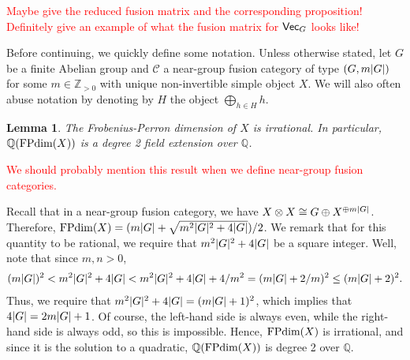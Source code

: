 \documentclass[12pt, reqno]{amsart}
\numberwithin{equation}{section}
\theoremstyle{plainspace}
\newtheorem{lemma}[theorem]{Lemma}
\theoremstyle{definitionspace}
\theoremstyle{remarkspace}
\renewenvironment{proof}{{\noindent\textbf{Proof.}}}{\null\hfill\qedsymbol}
\DeclarePairedDelimiter{\abs}{\lvert}{\rvert}
\newcommand{\mathcat}[1]{\mathcal{#1}}
\newcommand{\textcat}[1]{\textup{\textsf{#1}}}
\newcommand{\FPdim}{\textup{FPdim}}
\begin{document}
\noindent \textcolor{red}{Maybe give the reduced fusion matrix and the corresponding proposition! Definitely give an example of what the fusion matrix for $\textcat{Vec}_G$ looks like!}
\newline

\noindent Before continuing, we quickly define some notation. Unless otherwise stated, let $G$ be a finite Abelian group and $\mathcat{C}$ a near-group fusion category of type $(G, m\abs{G})$ for some $m \in \mathbb{Z}_{>0}$ with unique non-invertible simple object $X$. We will also often abuse notation by denoting by $H$ the object $\bigoplus_{h \in H}{h}$.
\newline

\begin{lemma}\label{lem:near-group_non-invertible_irrational}
The Frobenius-Perron dimension of $X$ is irrational. In particular, $\mathbb{Q}(\FPdim(X))$ is a degree 2 field extension over $\mathbb{Q}$.
\end{lemma}
\leavevmode

\noindent \textcolor{red}{We should probably mention this result when we define near-group fusion categories.}
\newline

\begin{proof}
Recall that in a near-group fusion category, we have $X \otimes X \cong G \oplus X^{\oplus m\abs{G}}$. Therefore, $\FPdim(X) = (m\abs{G} + \sqrt{m^2\abs{G}^2 + 4\abs{G}})/2$. We remark that for this quantity to be rational, we require that $m^2\abs{G}^2 + 4\abs{G}$ be a square integer. Well, note that since $m, n > 0$,
\begin{align*}
\begin{split}
(m\abs{G})^2 < m^2\abs{G}^2 + 4\abs{G} < m^2\abs{G}^2 + 4\abs{G} + 4/m^2 = (m\abs{G} + 2/m)^2 \leq (m\abs{G} + 2)^2.
\end{split}
\end{align*}
Thus, we require that $m^2\abs{G}^2 + 4\abs{G} = (m\abs{G} + 1)^2$, which implies that $4\abs{G} = 2m\abs{G} + 1$. Of course, the left-hand side is always even, while the right-hand side is always odd, so this is impossible. Hence, $\FPdim(X)$ is irrational, and since it is the solution to a quadratic, $\mathbb{Q}(\FPdim(X))$ is degree 2 over $\mathbb{Q}$.
\end{proof}
\newline
\end{document}
